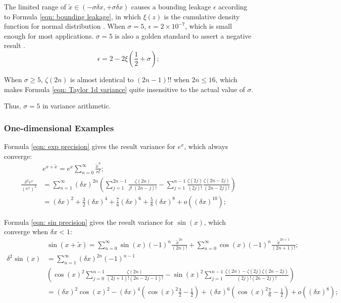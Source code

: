 \documentclass[twoside]{article}
\numberwithin{equation}{section}
\begin{document}
The limited range of $\tilde{x} \in (-\sigma \delta x, +\sigma \delta x)$ causes a bounding leakage $\epsilon$ according to Formula \eqref{eqn: bounding leakage}, in which $\xi(z)$ is the cumulative density function for normal distribution \cite{Probability_Statistics}.
When $\sigma = 5$, $\epsilon = 2 \times 10^{-7}$, which is small enough for most applications.
$\sigma = 5$ is also a golden standard to assert a negative result \cite{Precisions_Physical_Measurements}.
\begin{equation}
\label{eqn: bounding leakage}
\epsilon = 2 - 2 \xi(\frac{1}{2} + \sigma);
\end{equation}

When $\sigma \geq 5$, $\zeta(2n)$ is almost identical to $(2n -1)!!$ when $2n \leq 16$, which makes Formula \eqref{eqn: Taylor 1d variance} quite insensitive to the actual value of $\sigma$.

Thus, $\sigma = 5$ in variance arithmetic.


\subsubsection{One-dimensional Examples}

Formula \eqref{eqn: exp precision} gives the result variance for $e^x$, which always converge:
\begin{align}
\label{eqn: exp Taylor}
& e^{x + \tilde{x}} = e^x \sum_{n=0}^{\infty} \frac{\tilde{x}^n}{n!}; \\
\label{eqn: exp precision}
\frac{\delta^2 e^x}{(e^x)^2} &= \sum_{n=1}^{\infty} (\delta x)^{2n}  \left( \sum_{j=1}^{2n-1} \frac{\zeta(2n)}{j!\;(2n - j)!} 
 -\sum_{j=1}^{n-1} \frac{\zeta(2j)}{(2j)!} \frac{\zeta(2n - 2j)}{(2n - 2j)!} \right) \\
 &= (\delta x)^2 + \frac{3}{2} (\delta x)^4 + \frac{7}{6} (\delta x)^6 + \frac{5}{8} (\delta x)^8 + o((\delta x)^{10});
\end{align}

Formula \eqref{eqn: sin precision} gives the result variance for $\sin(x)$, which converge when $\delta x < 1$:
\begin{align}
\label{eqn: sin Taylor}
& \sin(x + \tilde{x}) = \sum_{n=0}^{\infty} \sin(x) (-1)^{n} \frac{\tilde{x}^{2n}}{(2n)!} + \sum_{n=0}^{\infty} \cos(x) (-1)^n \frac{\tilde{x}^{2n+1}}{(2n + 1)!}; \\
\label{eqn: sin precision}
\delta^2 \sin(x) &= \sum_{n=1}^{\infty} (\delta x)^{2n} (-1)^{n - 1} \nonumber \\
 & \left( \cos(x)^2 \sum_{j=0}^{n-1} \frac{\zeta(2n)}{(2j+1)!(2n-2j-1)!}
      - \sin(x)^2 \sum_{j=1}^{n-1} \frac{\zeta(2n) - \zeta(2j) \zeta(2n-2j)}{(2j)!(2n-2j)!} \right) \\ 
 &=  (\delta x)^2 \cos(x)^2 - (\delta x)^4 (\cos(x)^2 \frac{3}{2} - \frac{1}{2}) + (\delta x)^6 (\cos(x)^2 \frac{7}{6} - \frac{1}{2})  + o((\delta x)^8);
\end{align}
\end{document}
